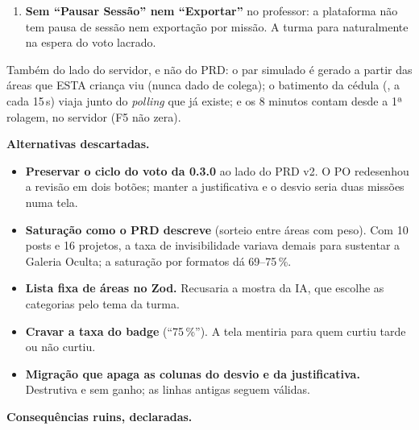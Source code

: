 \begin{enumerate}
     falava em \enquote{robô dos bueiros},
    \enquote{hortas} e \enquote{drones}, que não estão entre os dezesseis, e
    cravava \enquote{os outros 12 projetos} e \enquote{três quartos}. As três
    vagas passaram a citar o alarme de enchente e a composteira da merenda (e o
    que cada feed mostrou), e os números viraram \enquote{os projetos das outras
    áreas} e \enquote{mais da metade}: a taxa é de cada computador. A forma e o
    tom do PO ficam; o áudio é regerado ( 2).
    Na mostra da IA nada muda: as vagas já saem dos estandes do professor.
  \item \textbf{Sem \enquote{Pausar Sessão} nem \enquote{Exportar}} no
    professor: a plataforma não tem pausa de sessão nem exportação por
    missão. A turma para naturalmente na espera do voto lacrado.
\end{enumerate}

\noindent Também do lado do servidor, e não do PRD: o par simulado é gerado a
partir das áreas que ESTA criança viu (nunca dado de colega); o batimento da
cédula (, a cada 15\,s) viaja junto
do \emph{polling} que já existe; e os 8 minutos contam desde a 1ª rolagem,
no servidor (F5 não zera).

\textbf{Alternativas descartadas.}

\begin{itemize}
  \item \textbf{Preservar o ciclo do voto da 0.3.0} ao lado do PRD v2. O PO
    redesenhou a revisão em dois botões; manter a justificativa e o desvio
    seria duas missões numa tela.
  \item \textbf{Saturação como o PRD descreve} (sorteio entre áreas com peso).
    Com 10 posts e 16 projetos, a taxa de invisibilidade variava demais para
    sustentar a Galeria Oculta; a saturação por formatos dá 69--75\,\%.
  \item \textbf{Lista fixa de áreas no Zod.} Recusaria a mostra da IA, que
    escolhe as categorias pelo tema da turma.
  \item \textbf{Cravar a taxa do badge} (\enquote{75\,\%}). A tela mentiria
    para quem curtiu tarde ou não curtiu.
  \item \textbf{Migração que apaga as colunas do desvio e da justificativa.}
    Destrutiva e sem ganho; as linhas antigas seguem válidas.
\end{itemize}

\textbf{Consequências ruins, declaradas.}

